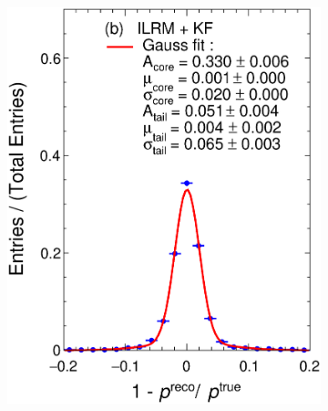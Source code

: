 \begin{figure}[t]
\begin{subfigure}{0.32\textwidth}
         \includegraphics[width=\textwidth]{figures/ch4-KF_NDGArLite/MC/ILRM+KF/pResKF_doublegauss.eps}
         \caption{}
         \label{fig:respKF_GArLite_ILRM+KF}
     \end{subfigure}
    \begin{subfigure}{0.32\textwidth}
         \centering

\end{subfigure}
\end{figure}
